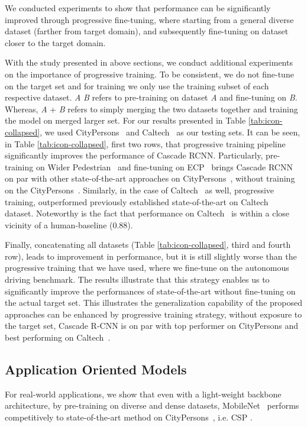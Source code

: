 \documentclass[final]{cvpr}
\newcommand{\caltech}[1]{{Caltech~\cite{dollar2012pedestrian}}}
\newcommand{\cityperson}[1]{{CityPersons~\cite{zhang2017citypersons}}}
\newcommand{\ecp}[1]{{ECP~\cite{braun2018eurocity}}}
\newcommand{\widerperson}[1]{{Wider Pedestrian~\cite{zhang2019widerperson}}}
\newcommand{\mobnet}[1]{{MobileNet~\cite{howard2017mobilenets}}}
\newcommand{\citypersona}[1]{{CityPersons}}
\begin{document}
We conducted experiments to show that performance can be significantly improved through progressive fine-tuning, where starting from a general diverse dataset (farther from target domain), and subsequently fine-tuning on dataset closer to the target domain.  

With the study presented in above sections, we conduct additional experiments on the importance of progressive training. To be consistent, we do not fine-tune on the target set and for training we only use the training subset of each respective dataset. \emph{A}  \emph{B} refers to pre-training on dataset \emph{A} and fine-tuning on \emph{B}.
Whereas, \emph{A} + \emph{B} refers to simply merging the two datasets together and training the model on merged larger set. For our results presented in Table \ref{tab:icon-collapsed}, we used \cityperson{} and \caltech{} as our testing sets. It can be seen, in Table \ref{tab:icon-collapsed}, first two rows, that progressive training pipeline significantly improves the performance of Cascade RCNN. Particularly, pre-training on \widerperson{} and fine-tuning on \ecp{} brings Cascade RCNN on par with other state-of-the-art approaches on \cityperson{}, without training on the \cityperson{}. Similarly, in the case of \caltech{} as well, progressive training, outperformed previously established state-of-the-art on \caltech{} dataset. Noteworthy is the fact that performance on \caltech{} is within a close vicinity of a human-baseline (0.88).   

Finally, concatenating all datasets (Table \ref{tab:icon-collapsed}, third and fourth row), leads to improvement in performance, but it is still slightly worse than the progressive training that we have used, where we fine-tune on the autonomous driving benchmark.
The results illustrate that this strategy enables us to significantly improve the performances of state-of-the-art without fine-tuning on the actual target set. This illustrates the generalization capability of the proposed approaches can be enhanced by progressive training strategy, without exposure to the target set, Cascade R-CNN \cite{cai2019cascade} is on par with top performer on \citypersona{} and best performing on \caltech{}.

\subsection{Application Oriented Models}

For real-world applications, we show that even with a light-weight backbone architecture, by pre-training on diverse and dense datasets, \mobnet{} performs competitively to state-of-the-art method on \cityperson{}, i.e. CSP \cite{Liu2018DBC}. 
\end{document}
